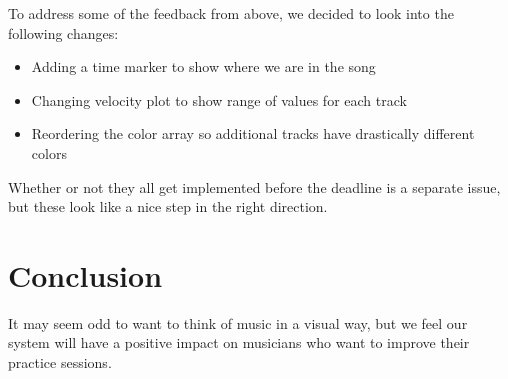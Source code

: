 \documentclass[journal]{vgtc}                %
\begin{document}
To address some of the feedback from above, we decided to look into the
following changes:

\begin{itemize}
  \item Adding a time marker to show where we are in the song
  \item Changing velocity plot to show range of values for each track
  \item Reordering the color array so additional tracks have drastically different colors
\end{itemize}

Whether or not they all get implemented before the deadline is a separate
issue, but these look like a nice step in the right direction.

\section{Conclusion}

It may seem odd to want to think of music in a visual way, but we feel our
system will have a positive impact on musicians who want to improve their
practice sessions.
\end{document}

